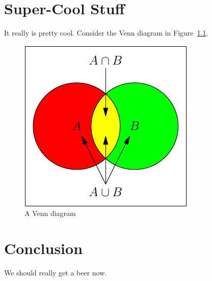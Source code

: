 \documentclass[12pt,openany,oneside]{report}
\begin{document}
\chapter{Super-Cool Stuff}

It really is pretty cool.  Consider the Venn diagram in Figure~\ref{venn}.

\begin{figure}[htbp]
  \begin{center}
    \includegraphics{venn}
    \caption{A Venn diagram}
    \label{venn}
  \end{center}
\end{figure}



\chapter{Conclusion}

We should really get a beer now.

\singlespacing
{

}

\vfill
\textheight 9in
\eject
\topmargin -1in
\clearpage
{}
{}
\printindex
\end{document}
